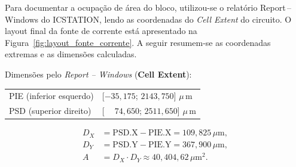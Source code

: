 \documentclass[12pt,a4paper]{article}
\begin{document}
Para documentar a ocupação de área do bloco, utilizou-se o relatório Report\,--\,Windows do ICSTATION, lendo as coordenadas do \emph{Cell Extent} do circuito. O layout final da fonte de corrente está apresentado na Figura~\ref{fig:layout_fonte_corrente}. A seguir resumem-se as coordenadas extremas e as dimensões calculadas.

\noindent Dimensões pelo \emph{Report -- Windows} (\textbf{Cell Extent}):
\begin{center}
\begin{tabular}{@{}ll@{}}
PIE (inferior esquerdo) & [$-35{,}175$; $2143{,}750$]\,\,$\mu$\,m \\
PSD (superior direito)  & [$\phantom{-}74{,}650$; $2511{,}650$]\,\,$\mu$\,m \\
\end{tabular}
\end{center}

\[
\begin{aligned}
D_X &= \text{PSD.X} - \text{PIE.X} = 109{,}825\,\mu\text{m},\\
D_Y &= \text{PSD.Y} - \text{PIE.Y} = 367{,}900\,\mu\text{m},\\
A   &= D_X\cdot D_Y \approx 40{,}404{,}62\,\mu\text{m}^2.
\end{aligned}
\]
\end{document}
